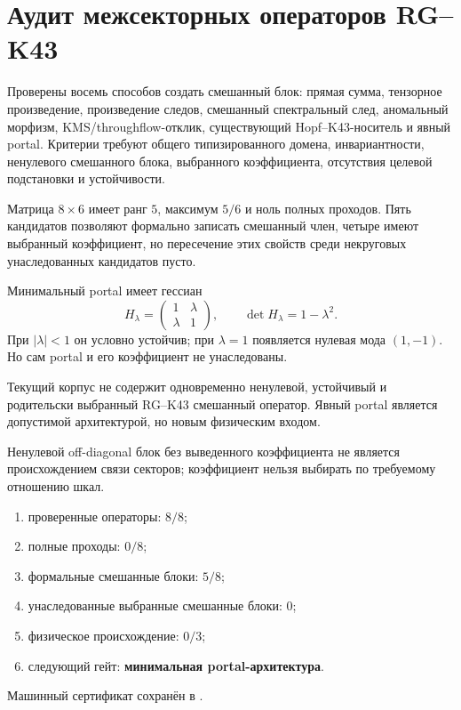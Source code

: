 \chapter{Аудит межсекторных операторов RG--K43}
\label{ch:v10-birth-tick-cross-sector-operator-audit}

Проверены восемь способов создать смешанный блок: прямая сумма, тензорное
произведение, произведение следов, смешанный спектральный след, аномальный
морфизм, KMS/throughflow-отклик, существующий Hopf--K43-носитель и явный
portal. Критерии требуют общего типизированного домена, инвариантности,
ненулевого смешанного блока, выбранного коэффициента, отсутствия целевой
подстановки и устойчивости.

Матрица $8\times6$ имеет ранг $5$, максимум $5/6$ и ноль полных проходов.
Пять кандидатов позволяют формально записать смешанный член, четыре имеют
выбранный коэффициент, но пересечение этих свойств среди некруговых
унаследованных кандидатов пусто.

Минимальный portal имеет гессиан
\begin{equation}
 H_\lambda=\begin{pmatrix}1&\lambda\\\lambda&1\end{pmatrix},
 \qquad \det H_\lambda=1-\lambda^2.
\end{equation}
При $|\lambda|<1$ он условно устойчив; при $\lambda=1$ появляется нулевая
мода $(1,-1)$. Но сам portal и его коэффициент не унаследованы.

\begin{theorem}
Текущий корпус не содержит одновременно ненулевой, устойчивый и
родительски выбранный RG--K43 смешанный оператор. Явный portal является
допустимой архитектурой, но новым физическим входом.
\end{theorem}

\begin{nogocriterion}
Ненулевой off-diagonal блок без выведенного коэффициента не является
происхождением связи секторов; коэффициент нельзя выбирать по требуемому
отношению шкал.
\end{nogocriterion}

\begin{protocol}\begin{enumerate}
\item проверенные операторы: \textbf{$8/8$};
\item полные проходы: \textbf{$0/8$};
\item формальные смешанные блоки: \textbf{$5/8$};
\item унаследованные выбранные смешанные блоки: \textbf{$0$};
\item физическое происхождение: \textbf{$0/3$};
\item следующий гейт: \textbf{минимальная portal-архитектура}.
\end{enumerate}\end{protocol}

Машинный сертификат сохранён в
.